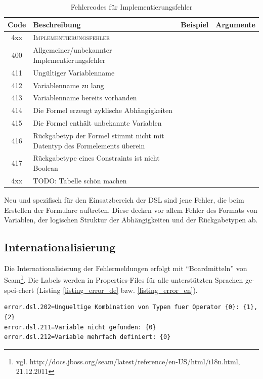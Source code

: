 \begin{table}
\begin{tabular}[ht]{|c | p{6cm} | p{2cm}| p{3cm} |}
	\hline
	\textbf{Code} & \textbf{Beschreibung} & \textbf{Beispiel} & \textbf{Argumente}\\
	\hline
  	\hline
  	4xx  & \multicolumn{3}{|l|}{\textsc{Implementierungsfehler}} \\
  	\hline
  	400  & Allgemeiner/unbekannter Implementierungsfehler &  & \\
  	\hline
  	411  & Ungültiger Variablenname & & \\
  	\hline
  	412  & Variablenname zu lang & & \\
  	\hline
  	413  & Variablenname bereits vorhanden & &\\
  	\hline
  	414  & Die Formel erzeugt zyklische Abhängigkeiten & & \\
  	\hline
  	415  & Die Formel enthält unbekannte Variablen & & \\
  	\hline
  	416  & Rückgabetyp der Formel stimmt nicht mit Datentyp des Formelements überein & & \\
  	\hline
  	417  & Rückgabetype eines Constraints ist nicht Boolean & & \\
  	\hline
  	4xx  & TODO: Tabelle schön machen & & \\
  	\hline
\end{tabular}
\caption{Fehlercodes für Implementierungsfehler}
\end{table}

Neu und spezifisch für den Einsatzbereich der DSL sind jene Fehler, die beim Erstellen der Formulare auftreten. Diese decken vor allem Fehler des Formats von Variablen, der logischen Struktur der Abhängigkeiten und der Rückgabetypen ab.



\subsection{Internationalisierung}

Die Internationalisierung der Fehlermeldungen erfolgt mit ``Boardmitteln'' von Seam\footnote{ vgl. http://docs.jboss.org/seam/latest/reference/en-US/html/i18n.html, 21.12.2011}. Die Labels werden in Properties-Files für alle unterstützten Sprachen ge-spei-chert (Listing \ref{listing_error_de} bzw. \ref{listing_error_en}).

\begin{lstlisting}[float = htbp,caption={Deutsche Fehlermeldungen },label=listing_error_de]
error.dsl.202=Ungueltige Kombination von Typen fuer Operator {0}: {1}, {2}
error.dsl.211=Variable nicht gefunden: {0}
error.dsl.212=Variable mehrfach definiert: {0}
\end{lstlisting}

